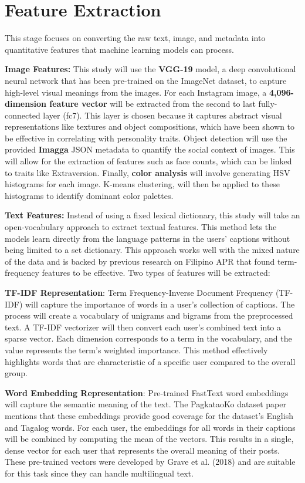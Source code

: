 \section{Feature Extraction}
\label{subsec:features}

This stage focuses on converting the raw text, image, and metadata into quantitative features that machine learning models can process. 

\textbf{Image Features:}
This study will use the \textbf{VGG-19} model, a deep convolutional neural network that has been pre-trained on the ImageNet dataset, to capture high-level visual meanings from the images. For each Instagram image, a \textbf{4,096-dimension feature vector} will be extracted from the second to last fully-connected layer (fc7). This layer is chosen because it captures abstract visual representations like textures and object compositions, which have been shown to be effective in correlating with personality traits. Object detection will use the provided \textbf{Imagga} JSON metadata to quantify the social context of images.  This will allow for the extraction of features such as face counts, which can be linked to traits like Extraversion.  Finally, \textbf{color analysis} will involve generating HSV histograms for each image. K-means clustering, will then be applied to these histograms to identify dominant color palettes.

\textbf{Text Features:}
Instead of using a fixed lexical dictionary, this study will take an open-vocabulary approach to extract textual features. This method lets the models learn directly from the language patterns in the users' captions without being limited to a set dictionary. This approach works well with the mixed nature of the data and is backed by previous research on Filipino APR that found term-frequency features to be effective. Two types of features will be extracted: 

\textbf{TF-IDF Representation}: Term Frequency-Inverse Document Frequency (TF-IDF) will capture the importance of words in a user's collection of captions. The process will create a vocabulary of unigrams and bigrams from the preprocessed text. A TF-IDF vectorizer will then convert each user's combined text into a sparse vector. Each dimension corresponds to a term in the vocabulary, and the value represents the term's weighted importance. This method effectively highlights words that are characteristic of a specific user compared to the overall group.

\textbf{Word Embedding Representation}: Pre-trained FastText word embeddings will capture the semantic meaning of the text. The PagkataoKo dataset paper mentions that these embeddings provide good coverage for the dataset's English and Tagalog words. For each user, the embeddings for all words in their captions will be combined by computing the mean of the vectors. This results in a single, dense vector for each user that represents the overall meaning of their posts. These pre-trained vectors were developed by Grave et al. (2018) and are suitable for this task since they can handle multilingual text.


